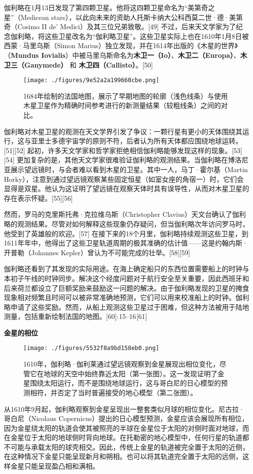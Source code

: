 伽利略在1月13日发现了第四颗卫星。他将这四颗卫星命名为“美第奇之星”（Medicean stars），以此向未来的资助人托斯卡纳大公科西莫二世·德·美第奇（Cosimo II de' Medici）及其三位兄弟致敬。[49] 不过，后来天文学家为了纪念伽利略，将这些卫星改名为“伽利略卫星”。这些卫星实际上也在1610年1月8日被西蒙·马里乌斯（Simon Marius）独立发现，并在1614年出版的《木星的世界》（\textbf{Mundus Iovialis}）中被马里乌斯命名为\textbf{木卫一（Io）}、\textbf{木卫二（Europa）}、\textbf{木卫三（Ganymede）} 和 \textbf{木卫四（Callisto）}。[50]
\begin{figure}[ht]
\centering
\texttt{[image: ./figures/9e52a2a199660cbe.png]}
\caption{1684年绘制的法国地图，展示了早期地图的轮廓（浅色线条）与使用木星卫星作为精确时间参考进行的新测量结果（较粗线条）之间的对比。} \label{fig_JLL_5}
\end{figure}
伽利略对木星卫星的观测在天文学界引发了争议：一颗行星有更小的天体围绕其运行，这与亚里士多德宇宙学的原则不符，后者认为所有天体都应围绕地球运转。[51][52] 起初，许多天文学家和哲学家拒绝相信伽利略能够发现这样的现象。[53][54] 更加复杂的是，其他天文学家很难验证伽利略的观测结果。当伽利略在博洛尼亚展示望远镜时，与会者难以看到木星的卫星。其中一人，马丁·霍尔基（Martin Horky），注意到通过望远镜观察某些固定恒星（如室女座的角宿一）时，它们会显得是双星。他认为这证明了望远镜在观察天体时具有误导性，从而对木星卫星的存在表示怀疑。[55][56]  

然而，罗马的克里斯托弗·克拉维乌斯（Christopher Clavius）天文台确认了伽利略的观测结果。尽管对如何解释这些现象仍存疑问，但当伽利略次年访问罗马时，他受到了英雄般的欢迎。[57] 在接下来的18个月里，伽利略持续观测这些卫星，到1611年年中，他得出了这些卫星轨道周期的极其准确的估计值——这是约翰内斯·开普勒（Johannes Kepler）曾认为不可能完成的壮举。[58][59]  

伽利略还看到了其发现的实际用途。在海上确定船只的东西位置需要船上的时钟与本初子午线的时钟同步。解决这个经度问题对于航行安全至关重要，因此西班牙和后来荷兰都设立了巨额奖励来鼓励这一问题的解决。由于伽利略发现的卫星的掩食现象相对频繁且时间可以被非常准确地预测，它们可以用来校准船上的时钟。伽利略申请了这些奖励。然而，从船上观测这些卫星过于困难，但这种方法被用于陆地测量，包括重新绘制法国的地图。[60]: 15–16 [61]

\textbf{金星的相位}
\begin{figure}[ht]
\centering
\texttt{[image: ./figures/5532f8a9bd158eb0.png]}
\caption{1610年，伽利略·伽利莱通过望远镜观察到金星展现出相位变化，尽管它在地球的天空中始终靠近太阳（第一张图）。这一发现证明了金星围绕太阳运行，而不是围绕地球运行，这与哥白尼的日心模型的预测相符，并否定了当时普遍接受的地心模型（第二张图）。} \label{fig_JLL_6}
\end{figure}
从1610年9月起，伽利略观察到金星呈现出一整套类似月球的相位变化。尼古拉·哥白尼（Nicolaus Copernicus）提出的日心模型预测，金星应该会展现所有相位，因为金星绕太阳的轨道会使其被照亮的半球在金星位于太阳的对侧时面对地球，而在金星位于太阳的地球侧时背向地球。在托勒密的地心模型中，任何行星的轨道都不可能与承载太阳的球壳相交。因此，传统上金星的轨道被完全置于太阳的近侧，在这种情况下金星只能呈现新月和朔相。也可以将其轨道完全置于太阳的远侧，这样金星只能呈现盈凸相和满相。

